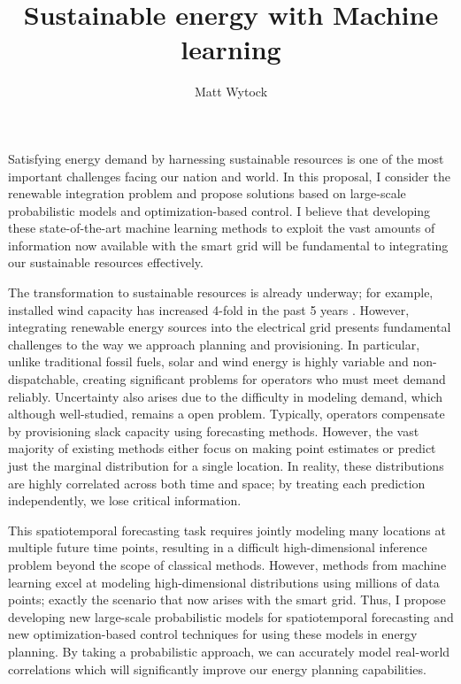 \documentclass[12pt]{article}
\title{Sustainable energy with Machine learning}
\author{Matt Wytock}
\begin{document}
Satisfying energy demand by harnessing sustainable resources is one of the most important challenges facing our nation and world. In this proposal, I consider the renewable integration problem and propose solutions based on large-scale probabilistic models and optimization-based control. I believe that developing these state-of-the-art machine learning methods to exploit the vast amounts of information now available with the smart grid will be fundamental to integrating our sustainable resources effectively.

The transformation to sustainable resources is already underway; for example, installed wind capacity has increased 4-fold in the past 5 years \cite{doe.12}. However, integrating renewable energy sources into the electrical grid presents fundamental challenges to the way we approach planning and provisioning. In particular, unlike traditional fossil fuels, solar and wind energy is highly variable and non-dispatchable, creating significant problems for operators who must meet demand reliably. Uncertainty also arises due to the difficulty in modeling demand, which although well-studied, remains a open problem. Typically, operators compensate by provisioning slack capacity using forecasting methods. However, the vast majority of existing methods either focus on making point estimates or predict just the marginal distribution for a single location. In reality, these distributions are highly correlated across both time and space; by treating each prediction independently, we lose critical information.

This spatiotemporal forecasting task requires jointly modeling many locations at multiple future time points, resulting in a difficult high-dimensional inference problem beyond the scope of classical methods. However, methods from machine learning excel at modeling high-dimensional distributions using millions of data points; exactly the scenario that now arises with the smart grid. Thus, I propose developing new large-scale probabilistic models for spatiotemporal forecasting and new optimization-based control techniques for using these models in energy planning. By taking a probabilistic approach, we can accurately model real-world correlations which will significantly improve our energy planning capabilities.
\end{document}
